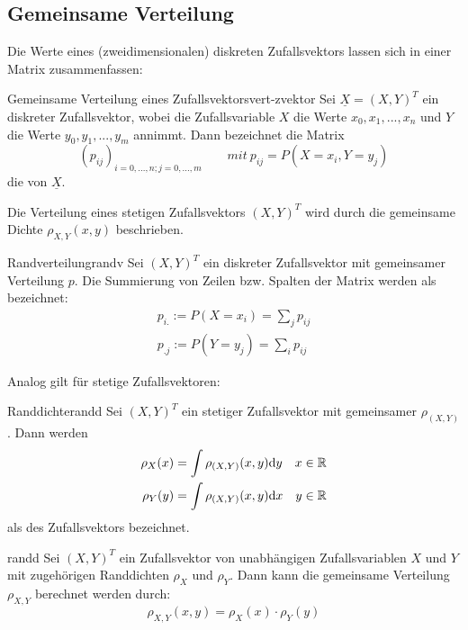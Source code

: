 \subsection{Gemeinsame Verteilung}

Die Werte eines (zweidimensionalen) diskreten Zufallsvektors lassen sich in einer Matrix
zusammenfassen:

\begin{definition}{Gemeinsame Verteilung eines Zufallsvektors}{vert-zvektor}
Sei $\underline{X} = (X, Y)^T$ ein diskreter Zufallsvektor, wobei die
Zufallsvariable $X$ die Werte $x_0, x_1, ..., x_n$ und $Y$ die Werte $y_0, y_1, ...,
y_m$ annimmt. Dann bezeichnet die Matrix
\[
(p_{ij})_{i=0,...,n;j=0,...,m} \qquad mit\ p_{ij} = P(X=x_i, Y=y_j)
\]
die  von $\underline{X}$.

Die Verteilung eines stetigen Zufallsvektors $(X,Y)^T$ wird durch die gemeinsame
Dichte $\rho_{X,Y}(x,y)$ beschrieben.
\end{definition}

\begin{definition}{Randverteilung}{randv}
Sei $(X,Y)^T$ ein diskreter Zufallsvektor mit gemeinsamer Verteilung $p$.
Die Summierung von Zeilen bzw. Spalten der Matrix werden als
 bezeichnet:
\begin{align*}
p_{i.}:=P(X=x_i) = \sum_j p_{ij} \\
p_{.j}:=P(Y=y_j) = \sum_i p_{ij}
\end{align*}
\end{definition}

Analog gilt für stetige Zufallsvektoren:
\begin{definition}{Randdichte}{randd}
Sei $(X,Y)^T$ ein stetiger Zufallsvektor mit gemeinsamer 
$\rho_{(X, Y)}$. Dann werden
\begin{align*}
\rho_X(x) = \int\rho_{(X,Y)}(x,y)\mathrm{d} y\quad x\in\mathbb{R}\\
\rho_Y(y) = \int\rho_{(X,Y)}(x,y)\mathrm{d} x\quad y\in\mathbb{R}
\end{align*}
als  des Zufallsvektors bezeichnet.
\end{definition}

\begin{theorem}{}{randd}
Sei $(X,Y)^T$ ein Zufallsvektor von unabhängigen Zufallsvariablen $X$ und $Y$
mit zugehörigen Randdichten $\rho_X$ und $\rho_Y$. Dann kann die gemeinsame
Verteilung $\rho_{X,Y}$ berechnet werden durch:
\[
\rho_{X,Y}(x,y) = \rho_X(x)\cdot\rho_Y(y)
\]
\end{theorem}

